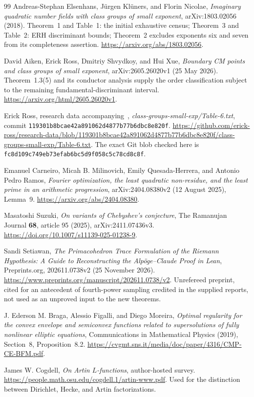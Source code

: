 \begin{thebibliography}{99}
Andreas-Stephan Elsenhans, J\"urgen Kl\"uners, and Florin Nicolae,
\emph{Imaginary quadratic number fields with class groups of small exponent},
arXiv:1803.02056 (2018).
Theorem~1 and Table~1: the initial exhaustive census;
Theorem~3 and Table~2: ERH discriminant bounds;
Theorem~2 excludes exponents six and seven from its completeness assertion.
\url{https://arxiv.org/abs/1803.02056}.

David Aiken, Erick Ross, Dmitriy Shvydkoy, and Hui Xue,
\emph{Boundary CM points and class groups of small exponent},
arXiv:2605.26020v1 (25 May 2026).
Theorem~1.3(5) and its conductor analysis supply the order classification subject to the remaining fundamental-discriminant interval.
\url{https://arxiv.org/html/2605.26020v1}.

Erick Ross, research data accompanying~\cite{ARSX},
\emph{class-groups-small-exp/Table-6.txt},
commit \texttt{119301b8bcae42a891062d4877b77b6dbc8e820f}.
\url{https://github.com/erick-ross/research-data/blob/119301b8bcae42a891062d4877b77b6dbc8e820f/class-groups-small-exp/Table-6.txt}.
The exact Git blob checked here is
\texttt{fc8d109c749eb73efab6bc5d9f058c5c78cd8c8f}.

Emanuel Carneiro, Micah B. Milinovich, Emily Quesada-Herrera, and Antonio Pedro Ramos,
\emph{Fourier optimization, the least quadratic non-residue, and the least prime in an arithmetic progression},
arXiv:2404.08380v2 (12 August 2025), Lemma~9.
\url{https://arxiv.org/abs/2404.08380}.

Masatoshi Suzuki,
\emph{On variants of Chebyshev's conjecture},
The Ramanujan Journal \textbf{68}, article 95 (2025),
arXiv:2411.07436v3.
\url{https://doi.org/10.1007/s11139-025-01238-9}.

Sandi Setiawan,
\emph{The Primacohedron Trace Formulation of the Riemann Hypothesis: A Guide to Reconstructing the Alp\"oge--Claude Proof in Lean},
Preprints.org, 202611.0738v2 (25 November 2026).
\url{https://www.preprints.org/manuscript/202611.0738/v2}.
Unrefereed preprint, cited for an antecedent of fourth-power sampling credited in the supplied reports, not used as an unproved input to the new theorems.

J. Ederson M. Braga, Alessio Figalli, and Diego Moreira,
\emph{Optimal regularity for the convex envelope and semiconvex functions related to supersolutions of fully nonlinear elliptic equations},
Communications in Mathematical Physics (2019), Section~8, Proposition~8.2.
\url{https://cvgmt.sns.it/media/doc/paper/4316/CMP-CE-BFM.pdf}.

James W. Cogdell,
\emph{On Artin $L$-functions}, author-hosted survey.
\url{https://people.math.osu.edu/cogdell.1/artin-www.pdf}.
Used for the distinction between Dirichlet, Hecke, and Artin factorizations.

\end{thebibliography}
